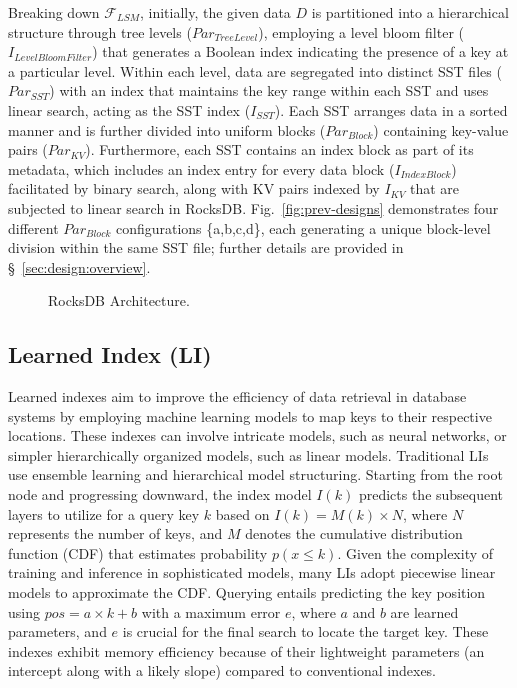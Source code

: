 Breaking down $\mathcal{F}_{LSM}$, initially, the given data $D$ is partitioned into a hierarchical structure through tree levels ($Par_{TreeLevel}$), employing a level bloom filter ($I_{LevelBloomFilter}$) that generates a Boolean index indicating the presence of a key at a particular level. Within each level, data are segregated into distinct SST files ($Par_{SST}$) with an index that maintains the key range within each SST and uses linear search, acting as the SST index ($I_{SST}$). Each SST arranges data in a sorted manner and is further divided into uniform blocks ($Par_{Block}$) containing key-value pairs ($Par_{KV}$). Furthermore, each SST contains an index block as part of its metadata, which includes an index entry for every data block ($I_{IndexBlock}$) facilitated by binary search, along with KV pairs indexed by $I_{KV}$ that are subjected to linear search in RocksDB. Fig.~\ref{fig:prev-designs} demonstrates four different $Par_{Block}$ configurations \{a,b,c,d\}, each generating a unique block-level division within the same SST file; further details are provided in \S~\ref{sec:design:overview}.

\begin{figure}[t]
  \centering
  \vspace{-1.5em}
  \caption{\small{RocksDB Architecture.}}
  \label{fig:sst-format}
  \vspace{-1.5em}
\end{figure}


\subsection{Learned Index (LI)}
\label{sec:li-storage}

Learned indexes \cite{ding2020alex, ferragina2020pgm, li2020lisa, tang2020xindex, kipf2020radixspline} aim to improve the efficiency of data retrieval in database systems by employing machine learning models to map keys to their respective locations. These indexes can involve intricate models, such as neural networks, or simpler hierarchically organized models, such as linear models.
Traditional LIs use ensemble learning and hierarchical model structuring. Starting from the root node and progressing downward, the index model $I(k)$ predicts the subsequent layers to utilize for a query key $k$ based on $I(k) = M(k) \times N$, where $N$ represents the number of keys, and $M$ denotes the cumulative distribution function (CDF) that estimates probability $p(x \le k)$. Given the complexity of training and inference in sophisticated models, many LIs adopt piecewise linear models to approximate the CDF. Querying entails predicting the key position using $pos = a \times k + b$ with a maximum error $e$, where $a$ and $b$ are learned parameters, and $e$ is crucial for the final search to locate the target key. These indexes exhibit memory efficiency because of their lightweight parameters (an intercept along with a likely slope) compared to conventional indexes.

